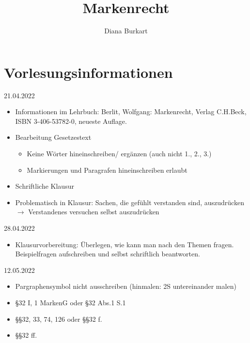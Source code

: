 \documentclass{report}
\title{Markenrecht}
\author{Diana Burkart}
\begin{document}
\maketitle
\newpage

\tableofcontents
\newpage

\chapter{Vorlesungsinformationen}
21.04.2022
\begin{itemize}
	\item Informationen im Lehrbuch: Berlit, Wolfgang: Markenrecht, Verlag C.H.Beck, ISBN 3-406-53782-0, neueste Auflage.
	\item Bearbeitung Gesetzestext
	\begin{itemize}
		\item Keine Wörter hineinschreiben/ ergänzen (auch nicht 1., 2., 3.)
		\item Markierungen und Paragrafen hineinschreiben erlaubt
	\end{itemize}
	\item Schriftliche Klausur
	\item Problematisch in Klausur:
	\newline Sachen, die gefühlt verstanden sind, auszudrücken $\rightarrow$ Verstandenes versuchen selbst auszudrücken
\end{itemize}
28.04.2022
\begin{itemize}
	\item Klausurvorbereitung: Überlegen, wie kann man nach den Themen fragen.
	\newline Beispielfragen aufschreiben und selbst schriftlich beantworten.
\end{itemize}
12.05.2022
\begin{itemize}
	\item Pargraphensymbol nicht ausschreiben (hinmalen: 2S untereinander malen)
	\item §32 I, 1 MarkenG oder §32 Abs.1 S.1
	\item §§32, 33, 74, 126 oder §§32 f.
	\item §§32 ff.
\end{itemize}
\end{document}
